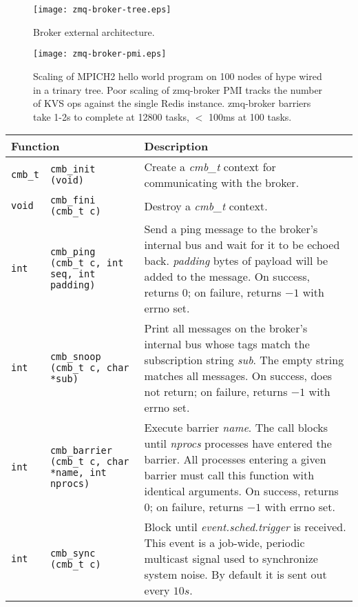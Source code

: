 \begin{figure}
\centering
\texttt{[image: zmq-broker-tree.eps]}
\caption{Broker external architecture.}
\label{fig:cmbext}
\end{figure}

\begin{figure}
\centering
\texttt{[image: zmq-broker-pmi.eps]}
\caption{Scaling of MPICH2 hello world program on 100 nodes of hype wired
in a trinary tree.  Poor scaling of zmq-broker PMI tracks the number of
KVS ops against the single Redis instance.  zmq-broker barriers take 1-2s
to complete at 12800 tasks, $<$ 100ms at 100 tasks.}
\label{fig:cmbscale}
\end{figure}


\begin{table}
\centering
\begin{tabular}{|p{0.7cm}p{5cm}|p{9cm}|}\hline
\multicolumn{2}{|l|}{\textbf{Function}}
  & \textbf{Description} \\
\hline
{\tt cmb\_t} & {\tt cmb\_init (void)}
  & Create a {\em cmb\_t} context for communicating with the broker.\\
{\tt void} & {\tt cmb\_fini (cmb\_t c)}
  & Destroy a {\em cmb\_t} context.\\
\hline
{\tt int} & {\tt cmb\_ping (cmb\_t c, int seq, int padding)}
  & Send a ping message to the broker's internal bus and wait for it
    to be echoed back.  {\em padding} bytes of payload will be added to
    the message.
    On success, returns $0$; on failure, returns $-1$ with errno set.\\
\hline
{\tt int} & {\tt cmb\_snoop (cmb\_t c, char {*sub})}
  & Print all messages on the broker's internal bus whose tags match the
    subscription string {\em sub}.  The empty string matches all messages.
    On success, does not return; on failure, returns $-1$ with errno set.\\
\hline
{\tt int}
  & {\tt cmb\_barrier (cmb\_t c, char {*name}, int nprocs)}
  & Execute barrier {\em name}.  The call blocks until {\em nprocs}
    processes have entered the barrier.  
    All processes entering a given barrier must call this function with
    identical arguments.
    On success, returns $0$; on failure, returns $-1$ with errno set.\\
\hline
{\tt int}
  & {\tt cmb\_sync (cmb\_t c)}
  & Block until {\em event.sched.trigger} is received.  This event is
    a job-wide, periodic multicast signal used to synchronize system noise.
    By default it is sent out every $10s$.

\end{tabular}
\end{table}
